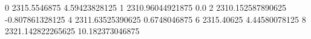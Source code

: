 0 2315.5546875 4.59423828125
1 2310.96044921875 0.0
2 2310.152587890625 -0.807861328125
4 2311.63525390625 0.6748046875
6 2315.40625 4.44580078125
8 2321.142822265625 10.182373046875
